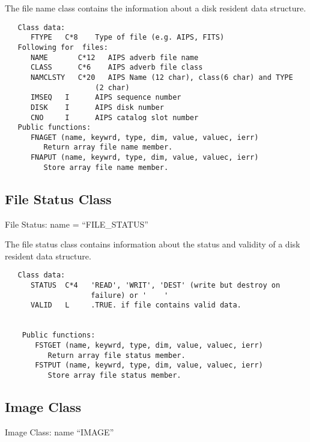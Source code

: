    The file name class contains the information about a disk resident
data structure.
{\small\begin{verbatim}
   Class data:
      FTYPE   C*8    Type of file (e.g. AIPS, FITS)
   Following for  files:
      NAME       C*12   AIPS adverb file name
      CLASS      C*6    AIPS adverb file class
      NAMCLSTY   C*20   AIPS Name (12 char), class(6 char) and TYPE
                     (2 char)
      IMSEQ   I      AIPS sequence number
      DISK    I      AIPS disk number
      CNO     I      AIPS catalog slot number
   Public functions:
      FNAGET (name, keywrd, type, dim, value, valuec, ierr)
         Return array file name member.
      FNAPUT (name, keywrd, type, dim, value, valuec, ierr)
         Store array file name member.
\end{verbatim}}

\subsection{File Status Class}

   File Status: name = ``FILE\_STATUS''

   The file status class contains information about the status and
validity of a disk resident data structure.
{\small\begin{verbatim}
   Class data:
      STATUS  C*4   'READ', 'WRIT', 'DEST' (write but destroy on
                    failure) or '    '
      VALID   L     .TRUE. if file contains valid data.


    Public functions:
       FSTGET (name, keywrd, type, dim, value, valuec, ierr)
          Return array file status member.
       FSTPUT (name, keywrd, type, dim, value, valuec, ierr)
          Store array file status member.
\end{verbatim}}

\subsection{Image Class}
   Image Class: name ``IMAGE''

